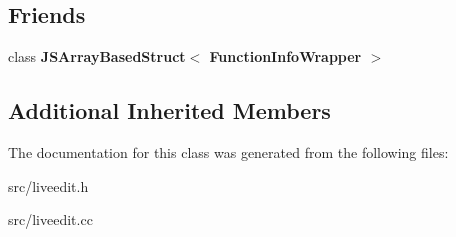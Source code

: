 \subsection*{Friends}
\begin{DoxyCompactItemize}
\item 
\hypertarget{classv8_1_1internal_1_1_function_info_wrapper_afa2900f7c737e92b2ae9ab216ea40a98}{}class {\bfseries J\+S\+Array\+Based\+Struct$<$ Function\+Info\+Wrapper $>$}\label{classv8_1_1internal_1_1_function_info_wrapper_afa2900f7c737e92b2ae9ab216ea40a98}

\end{DoxyCompactItemize}
\subsection*{Additional Inherited Members}


The documentation for this class was generated from the following files\+:\begin{DoxyCompactItemize}
\item 
src/liveedit.\+h\item 
src/liveedit.\+cc\end{DoxyCompactItemize}
